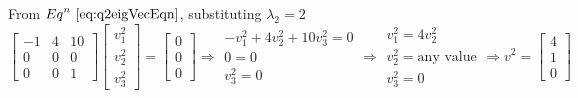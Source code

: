 \documentclass[a4paper]{article}
\begin{document}
\begin{qalist}
			From ${Eq}^{n}~\ref{eq:q2eigVecEqn}$, substituting ${\lambda}_{2} = 2$
			\begin{equation}
				\begin{bmatrix}-1 & 4 & 10 \\ 0 & 0 & 0 \\ 0 & 0 & 1\end{bmatrix} 
				\begin{bmatrix}{v}^{2}_{1} \\ {v}^{2}_{2} \\ {v}^{2}_{3}\end{bmatrix} = 
				\begin{bmatrix}0 \\ 0 \\ 0\end{bmatrix}
				\Rightarrow
				\begin{array}{c}
					-{v}^{2}_{1} + 4{v}^{2}_{2} + 10{v}^{2}_{3} = 0 \\
					0 = 0 \\
					{v}^{2}_{3} = 0
				\end{array}
				\Rightarrow \begin{array}{c}{v}^{2}_{1} = 4{v}^{2}_{2} \\ {v}^{2}_{2}=\text{any value}\\ {v}^{2}_{3}=0\end{array} \Rightarrow {v}^{2} = \begin{bmatrix}4 \\ 1 \\ 0\end{bmatrix}
			\end{equation}
			

\end{qalist}
\end{document}
